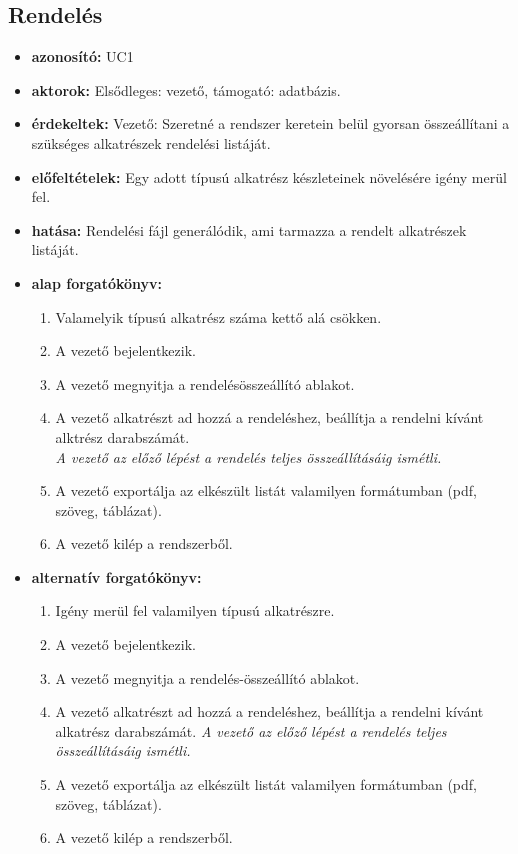 \documentclass[12pt]{article}\usepackage[left=20mm,right=20mm,top=15mm,bottom=20mm]{geometry}
\begin{document}
\subsection{Rendelés}
\begin{itemize}
\item[] \textbf{azonosító: } UC1

\item[] \textbf{aktorok: } Elsődleges: vezető, támogató: adatbázis.  

\item[] \textbf{érdekeltek: } Vezető: Szeretné a rendszer keretein belül gyorsan összeállítani a szükséges alkatrészek rendelési listáját.

\item[] \textbf{előfeltételek: } Egy adott típusú alkatrész készleteinek növelésére igény merül fel.

\item[] \textbf{hatása: } Rendelési fájl generálódik, ami tarmazza a rendelt alkatrészek listáját.

\item[] \textbf{alap forgatókönyv: }
\begin{enumerate}
\item Valamelyik típusú alkatrész száma kettő alá csökken.
\item A vezető bejelentkezik.
\item A vezető megnyitja a rendelésösszeállító ablakot.
\item A vezető alkatrészt ad hozzá a rendeléshez, beállítja a rendelni kívánt alktrész darabszámát. \\
\textit{A vezető az előző lépést a rendelés teljes összeállításáig ismétli.}
\item A vezető exportálja az elkészült listát valamilyen formátumban (pdf, szöveg, táblázat).
\item A vezető kilép a rendszerből.
\end{enumerate}

\item[] \textbf{alternatív forgatókönyv: }
\begin{enumerate}
\item Igény merül fel valamilyen típusú alkatrészre.
\item A vezető bejelentkezik.
\item A vezető megnyitja a rendelés-összeállító ablakot.
\item A vezető alkatrészt ad hozzá a rendeléshez, beállítja a rendelni kívánt alkatrész darabszámát.
\textit{A vezető az előző lépést a rendelés teljes összeállításáig ismétli.}
\item A vezető exportálja az elkészült listát valamilyen formátumban (pdf, szöveg, táblázat).
\item A vezető kilép a rendszerből.
\end{enumerate}


\end{itemize}
\end{document}
